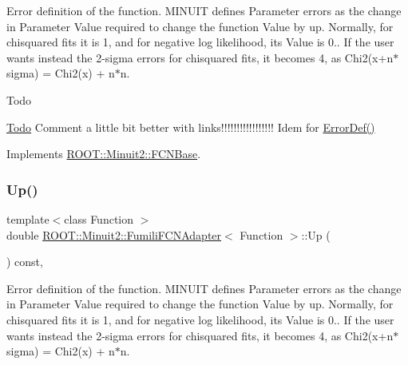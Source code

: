 Error definition of the function. M\+I\+N\+U\+IT defines Parameter errors as the change in Parameter Value required to change the function Value by up. Normally, for chisquared fits it is 1, and for negative log likelihood, its Value is 0.. If the user wants instead the 2-\/sigma errors for chisquared fits, it becomes 4, as Chi2(x+n$\ast$sigma) = Chi2(x) + n$\ast$n.

\begin{DoxyRefDesc}{Todo}
\item[\mbox{\hyperlink{todo__todo000001}{Todo}}]Comment a little bit better with links!!!!!!!!!!!!!!!!! Idem for \mbox{\hyperlink{classROOT_1_1Minuit2_1_1FCNBase_ac4592475c58a65b037ba97ab5f3cba10}{Error\+Def()}}\end{DoxyRefDesc}


Implements \mbox{\hyperlink{classROOT_1_1Minuit2_1_1FCNBase_a04ef08ddad92ce8d89d498efbe021c39}{R\+O\+O\+T\+::\+Minuit2\+::\+F\+C\+N\+Base}}.

\mbox{\label{classROOT_1_1Minuit2_1_1FumiliFCNAdapter_aeed5b77f0bcca4854a9e6b0620ab3cb9}} 
\subsubsection{\texorpdfstring{Up()}{Up()}\hspace{0.1cm}{\footnotesize\ttfamily [2/3]}}
{\footnotesize\ttfamily template$<$class Function $>$ \\
double \mbox{\hyperlink{classROOT_1_1Minuit2_1_1FumiliFCNAdapter}{R\+O\+O\+T\+::\+Minuit2\+::\+Fumili\+F\+C\+N\+Adapter}}$<$ Function $>$\+::Up (\begin{DoxyParamCaption}{ }\end{DoxyParamCaption}) const\hspace{0.3cm}{\ttfamily [inline]}, {\ttfamily [virtual]}}

Error definition of the function. M\+I\+N\+U\+IT defines Parameter errors as the change in Parameter Value required to change the function Value by up. Normally, for chisquared fits it is 1, and for negative log likelihood, its Value is 0.. If the user wants instead the 2-\/sigma errors for chisquared fits, it becomes 4, as Chi2(x+n$\ast$sigma) = Chi2(x) + n$\ast$n.

